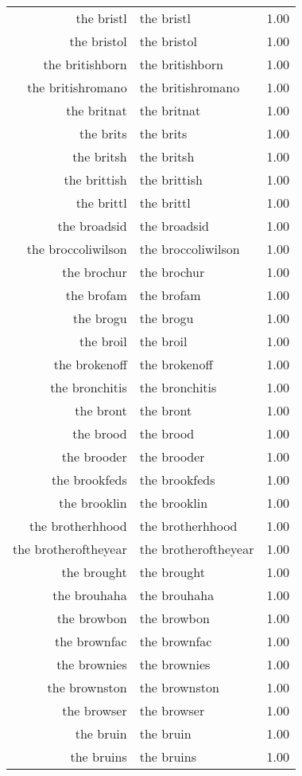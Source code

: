 \begin{table}[ht]
\begin{tabular}{rlr}
  the bristl & the bristl & 1.00 \\ 
  the bristol & the bristol & 1.00 \\ 
  the britishborn & the britishborn & 1.00 \\ 
  the britishromano & the britishromano & 1.00 \\ 
  the britnat & the britnat & 1.00 \\ 
  the brits & the brits & 1.00 \\ 
  the britsh & the britsh & 1.00 \\ 
  the brittish & the brittish & 1.00 \\ 
  the brittl & the brittl & 1.00 \\ 
  the broadsid & the broadsid & 1.00 \\ 
  the broccoliwilson & the broccoliwilson & 1.00 \\ 
  the brochur & the brochur & 1.00 \\ 
  the brofam & the brofam & 1.00 \\ 
  the brogu & the brogu & 1.00 \\ 
  the broil & the broil & 1.00 \\ 
  the brokenoff & the brokenoff & 1.00 \\ 
  the bronchitis & the bronchitis & 1.00 \\ 
  the bront & the bront & 1.00 \\ 
  the brood & the brood & 1.00 \\ 
  the brooder & the brooder & 1.00 \\ 
  the brookfeds & the brookfeds & 1.00 \\ 
  the brooklin & the brooklin & 1.00 \\ 
  the brotherhhood & the brotherhhood & 1.00 \\ 
  the brotheroftheyear & the brotheroftheyear & 1.00 \\ 
  the brought & the brought & 1.00 \\ 
  the brouhaha & the brouhaha & 1.00 \\ 
  the browbon & the browbon & 1.00 \\ 
  the brownfac & the brownfac & 1.00 \\ 
  the brownies & the brownies & 1.00 \\ 
  the brownston & the brownston & 1.00 \\ 
  the browser & the browser & 1.00 \\ 
  the bruin & the bruin & 1.00 \\ 
  the bruins & the bruins & 1.00 \\ 

\end{tabular}
\end{table}

